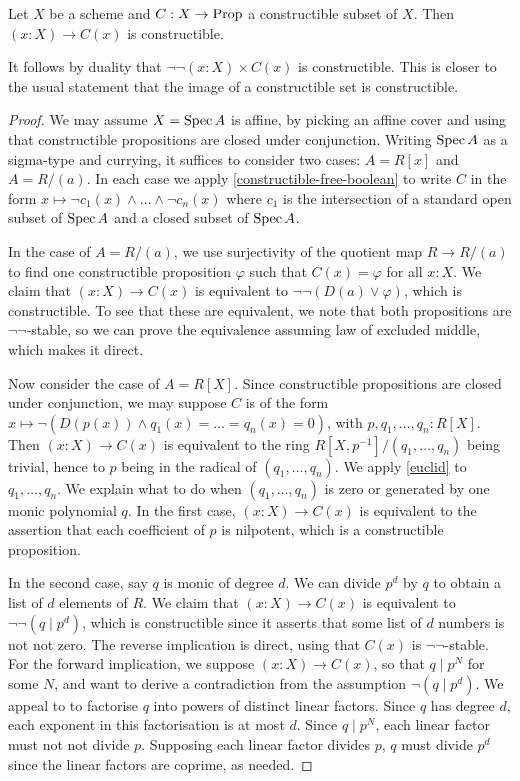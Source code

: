 \begin{theorem}
  Let $X$ be a scheme and $C : X \to \mathrm{Prop}$ a constructible subset of $X$.
  Then $(x : X) \to C(x)$ is constructible.
\end{theorem}
It follows by duality that $\neg \neg (x : X) \times C(x)$ is constructible.
This is closer to the usual statement that the image of a constructible set is constructible.
\begin{proof}
  We may assume $X = \operatorname{Spec} A$ is affine, by picking an affine cover and using that constructible propositions
  are closed under conjunction.
  Writing $\operatorname{Spec} A$ as a sigma-type and currying, it suffices to consider two cases:
  $A = R[x]$ and $A = R/(a)$.
  In each case we apply \cref{constructible-free-boolean} to write $C$
  in the form $x \mapsto \neg c_1(x) \wedge \ldots \wedge \neg c_n(x)$
  where $c_1$ is the intersection of a standard open subset of $\operatorname{Spec} A$ and
  a closed subset of $\operatorname{Spec} A$.
  
  In the case of $A = R/(a)$, we use surjectivity of the quotient map
  $R \to R/(a)$ to find one constructible proposition $\varphi$
  such that $C(x) = \varphi$ for all $x : X$. We claim
  that $(x : X) \to C(x)$ is
  equivalent to $\neg \neg (D(a) \vee \varphi)$, which is constructible.
  To see that these are equivalent, we note that both propositions are
  $\neg \neg$-stable, so we can prove the equivalence assuming law of excluded middle,
  which makes it direct.

  Now consider the case of $A = R[X]$. Since constructible propositions are closed under
  conjunction, we may suppose $C$ is of the form
  $x \mapsto \neg (D(p(x)) \wedge q_1(x) = \ldots = q_n(x) = 0)$, with
  $p, q_1,\ldots, q_n : R[X]$.
  Then $(x : X) \to C(x)$ is equivalent to the ring
  $R[X,p^{-1}]/(q_1,\ldots,q_n)$ being trivial, hence to
  $p$ being in the radical of $(q_1,\ldots,q_n)$.
  We apply \cref{euclid} to $q_1,\ldots,q_n$.
  We explain what to do when $(q_1,\ldots,q_n)$ is zero or generated by
  one monic polynomial $q$. In the first case, $(x : X) \to C(x)$
  is equivalent to the assertion that each coefficient of $p$ is nilpotent,
  which is a constructible proposition.
  
  In the second case, say $q$ is monic of degree $d$.
  We can divide $p^d$ by $q$ to obtain a list of $d$ elements of $R$.
  We claim that $(x : X) \to C(x)$ is equivalent to
  $\neg \neg (q \mid p^d)$, which is constructible
  since it asserts that some list of $d$ numbers is not not zero.
  The reverse implication is direct, using that $C(x)$ is $\neg \neg$-stable.
  For the forward implication, we suppose $(x : X) \to C(x)$, so
  that $q \mid p^N$ for some $N$, and want to derive a contradiction from
  the assumption $\neg (q \mid p^d)$.
  We appeal to \cite[lemma 3.4.3]{draft} to factorise $q$ into 
  powers of distinct linear factors. Since $q$ has degree $d$, each 
  exponent in this factorisation is at most $d$.
  Since $q \mid p^N$, each linear factor must not not divide $p$.
  Supposing each linear factor divides $p$, $q$ must divide $p^d$
  since the linear factors are coprime, as needed.
\end{proof}

